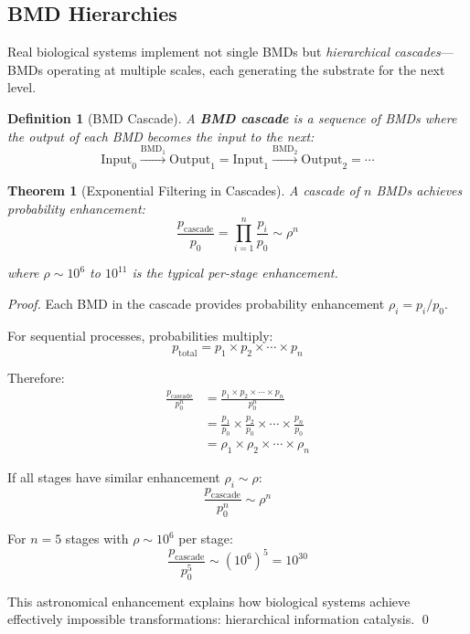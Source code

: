 \documentclass[12pt,a4paper]{article}
\newtheorem{theorem}{Theorem}
\newtheorem{definition}{Definition}
\begin{document}
\subsection{BMD Hierarchies}

Real biological systems implement not single BMDs but \textit{hierarchical cascades}—BMDs operating at multiple scales, each generating the substrate for the next level.

\begin{definition}[BMD Cascade]
\label{def:bmd_cascade}
A \textbf{BMD cascade} is a sequence of BMDs where the output of each BMD becomes the input to the next:
\begin{equation}
\text{Input}_0 \xrightarrow{\text{BMD}_1} \text{Output}_1 = \text{Input}_1 \xrightarrow{\text{BMD}_2} \text{Output}_2 = \cdots
\end{equation}
\end{definition}

\begin{theorem}[Exponential Filtering in Cascades]
\label{thm:exponential_filtering}
A cascade of $n$ BMDs achieves probability enhancement:
\begin{equation}
\frac{p_{\text{cascade}}}{p_0} = \prod_{i=1}^n \frac{p_i}{p_0} \sim \rho^n
\end{equation}

where $\rho \sim 10^6$ to $10^{11}$ is the typical per-stage enhancement.
\end{theorem}

\begin{proof}
Each BMD in the cascade provides probability enhancement $\rho_i = p_i/p_0$.

For sequential processes, probabilities multiply:
\begin{equation}
p_{\text{total}} = p_1 \times p_2 \times \cdots \times p_n
\end{equation}

Therefore:
\begin{align}
\frac{p_{\text{cascade}}}{p_0^n} &= \frac{p_1 \times p_2 \times \cdots \times p_n}{p_0^n} \\
&= \frac{p_1}{p_0} \times \frac{p_2}{p_0} \times \cdots \times \frac{p_n}{p_0} \\
&= \rho_1 \times \rho_2 \times \cdots \times \rho_n
\end{align}

If all stages have similar enhancement $\rho_i \sim \rho$:
\begin{equation}
\frac{p_{\text{cascade}}}{p_0^n} \sim \rho^n
\end{equation}

For $n = 5$ stages with $\rho \sim 10^6$ per stage:
\begin{equation}
\frac{p_{\text{cascade}}}{p_0^5} \sim (10^6)^5 = 10^{30}
\end{equation}

This astronomical enhancement explains how biological systems achieve effectively impossible transformations: hierarchical information catalysis. \qed
\end{proof}
\end{document}
